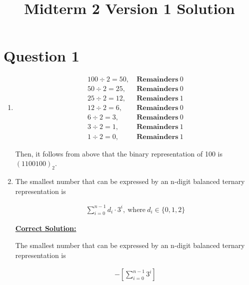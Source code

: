 \documentclass[12pt]{article}
\begin{document}
\title{Midterm 2 Version 1 Solution}
\maketitle

\section*{Question 1}
\begin{enumerate}
    \item

    \begin{align*}
        100 \div 2 = 50,\:&\textbf{Remainders}\:0\\
        50 \div 2 = 25,\:&\textbf{Remainders}\:0\\
        25 \div 2 = 12,\:&\textbf{Remainders}\:1\\
        12 \div 2 = 6,\:&\textbf{Remainders}\:0\\
        6 \div 2 = 3,\:&\textbf{Remainders}\:0\\
        3 \div 2 = 1,\:&\textbf{Remainders}\:1\\
        1 \div 2 = 0,\:&\textbf{Remainders}\:1
    \end{align*}

    \bigskip

    Then, it follows from above that the binary representation of 100 is $(1100100)_2$.

    \item

    The smallest number that can be expressed by an n-digit balanced ternary
    representation is

    \begin{align}
        \sum\limits_{i=0}^{n-1} d_i \cdot 3^i,\:\text{where}\:d_i \in \{0,1,2\}
    \end{align}

    \bigskip

    \begin{mdframed}
        \underline{\textbf{Correct Solution:}}

        \bigskip

        The smallest number that can be expressed by an n-digit balanced ternary
        representation is

        \begin{align}
            -\left[ \sum\limits_{i=0}^{n-1} 3^i \right]
        \end{align}
    \end{mdframed}


\end{enumerate}
\end{document}
